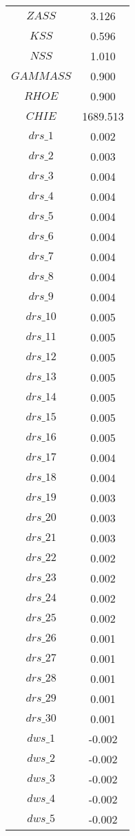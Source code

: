 \begin{center}
\begin{longtable}{cc}
$ZASS$ 	 & 	 3.126 \\
$KSS$ 	 & 	 0.596 \\
$NSS$ 	 & 	 1.010 \\
$GAMMASS$ 	 & 	 0.900 \\
$RHOE$ 	 & 	 0.900 \\
$CHIE$ 	 & 	 1689.513 \\
$drs\_1$ 	 & 	 0.002 \\
$drs\_2$ 	 & 	 0.003 \\
$drs\_3$ 	 & 	 0.004 \\
$drs\_4$ 	 & 	 0.004 \\
$drs\_5$ 	 & 	 0.004 \\
$drs\_6$ 	 & 	 0.004 \\
$drs\_7$ 	 & 	 0.004 \\
$drs\_8$ 	 & 	 0.004 \\
$drs\_9$ 	 & 	 0.004 \\
$drs\_10$ 	 & 	 0.005 \\
$drs\_11$ 	 & 	 0.005 \\
$drs\_12$ 	 & 	 0.005 \\
$drs\_13$ 	 & 	 0.005 \\
$drs\_14$ 	 & 	 0.005 \\
$drs\_15$ 	 & 	 0.005 \\
$drs\_16$ 	 & 	 0.005 \\
$drs\_17$ 	 & 	 0.004 \\
$drs\_18$ 	 & 	 0.004 \\
$drs\_19$ 	 & 	 0.003 \\
$drs\_20$ 	 & 	 0.003 \\
$drs\_21$ 	 & 	 0.003 \\
$drs\_22$ 	 & 	 0.002 \\
$drs\_23$ 	 & 	 0.002 \\
$drs\_24$ 	 & 	 0.002 \\
$drs\_25$ 	 & 	 0.002 \\
$drs\_26$ 	 & 	 0.001 \\
$drs\_27$ 	 & 	 0.001 \\
$drs\_28$ 	 & 	 0.001 \\
$drs\_29$ 	 & 	 0.001 \\
$drs\_30$ 	 & 	 0.001 \\
$dws\_1$ 	 & 	 -0.002 \\
$dws\_2$ 	 & 	 -0.002 \\
$dws\_3$ 	 & 	 -0.002 \\
$dws\_4$ 	 & 	 -0.002 \\
$dws\_5$ 	 & 	 -0.002 \\

\end{longtable}
\end{center}
